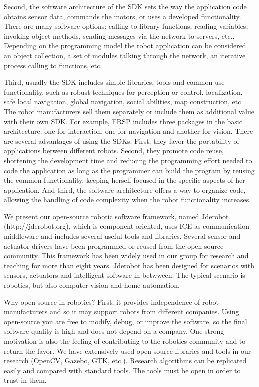 \documentclass[twocolumn]{svjour3}          %
\begin{document}
Second, the software architecture of the SDK sets the way the application code obtains sensor data, commands the motors, or uses a developed functionality. There are many software options: calling to library functions, reading variables, invoking object methods, sending messages via the network to servers, etc.. Depending on the programming model the robot application can be considered an object collection, a set of modules talking through the network, an iterative process calling to functions, etc.

Third, usually the SDK includes simple libraries, tools and common use functionality, such as robust techniques for perception or control, localization, safe local navigation, global navigation, social abilities, map construction, etc. The robot manufacturers sell them separately or include them as additional value with their own SDK. For example, ERSP includes three packages in the basic architecture: one for interaction, one for navigation and another for vision. There are several advantages of using the SDKs. First, they favor the portability of applications between different robots. Second, they promote code reuse, shortening the development time and reducing the programming effort needed to code the application as long as the programmer can build the program by reusing the common functionality, keeping herself focused in the specific aspects of her application. And third, the software architecture offers a way to organize code, allowing the handling of code complexity when the robot functionality increases.

We present our open-source robotic software framework, named Jderobot (http://jderobot.org), which is component oriented, uses ICE as communication middleware and includes several useful tools and libraries. Several sensor and actuator drivers have been programmed or reused from the open-source community. This framework has been widely used in our group for research and teaching for more than eight years. Jderobot has been designed for scenarios with sensors, actuators and intelligent software in betwween. The typical scenario is robotics, but also computer vision and home automation.

Why open-source in robotics? First, it provides independence of robot manufacturers and so it may support robots from different companies. Using open-source you are free to modify, debug, or improve the software, so the final software quality is high and does not depend on a company. One strong motivation is also the feeling of contributing to the robotics community and to return the favor. We have extensively used open-source libraries and tools in our research (OpenCV, Gazebo, GTK, etc.). Research algorithms can be replicated easily and compared with standard tools. The tools must be open in order to trust in them.
\end{document}
